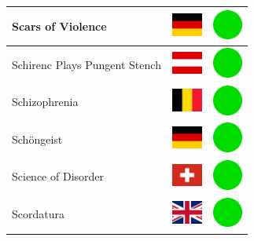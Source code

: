 \documentclass[12pt, a4paper, twoside]{report}
\begin{document}
\begin{center}
\begin{longtable}{|p{5cm}|p{2cm}|p{2cm}|}
 Scars of Violence                                          & \includegraphics[width=1cm]{../4x3/de} &   \includegraphics[width=1cm]{../likes/y} \\ \hline
 Schirenc Plays Pungent Stench                              & \includegraphics[width=1cm]{../4x3/at} &   \includegraphics[width=1cm]{../likes/y} \\ \hline
 Schizophrenia                                              & \includegraphics[width=1cm]{../4x3/be} &   \includegraphics[width=1cm]{../likes/y} \\ \hline
 Schöngeist                                                 & \includegraphics[width=1cm]{../4x3/de} &   \includegraphics[width=1cm]{../likes/y} \\ \hline
 Science of Disorder                                        & \includegraphics[width=1cm]{../4x3/ch} &   \includegraphics[width=1cm]{../likes/y} \\ \hline
 Scordatura                                                 & \includegraphics[width=1cm]{../4x3/gb} &   \includegraphics[width=1cm]{../likes/y} \\ \hline

\end{longtable}
\end{center}
\end{document}
